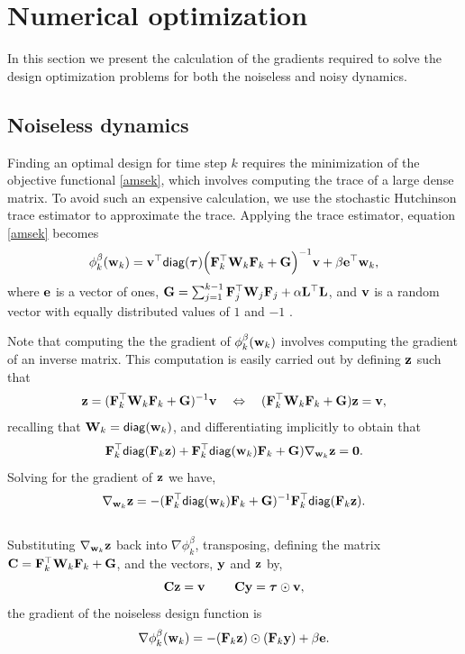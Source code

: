 \documentclass[leqno,onefignum,onetabnum]{siamltexmm}
\newcommand{\bfC}	{{\bf{C}}}
\newcommand{\bfF}	{{\bf{F}}}
\newcommand{\bfG}	{{\bf{G}}}
\newcommand{\bfL}	{{\bf{L}}}
\newcommand{\bfW}	{{\bf{W}}}
\newcommand{\bfe}	{{\bf{e}}}
\newcommand{\bfv}	{{\bf{v}}}
\newcommand{\bfw}	{{\bf{w}}}
\newcommand{\bfy}	{{\bf{y}}}
\newcommand{\bfz}	{{\bf{z}}}
\newcommand{\bftau}      {{\boldsymbol \tau}}
\newcommand {\zero}  {{\bf 0}}
\newcommand{\Grad}	{\ensuremath {{\bf{ \nabla}}}}
\newcommand{\LtL}       { \bfL^{\top}\bfL}
\begin{document}
\section{Numerical optimization}
\label{sec:Opt}
In this section we present the calculation of the gradients required to solve the design optimization problems for both the noiseless and noisy dynamics. 
\subsection{Noiseless dynamics}
Finding an optimal design for  time step $k$ requires the minimization of the objective functional \eqref{amsek}, which involves computing the trace of a large dense matrix. To avoid such an expensive calculation, we use the stochastic Hutchinson trace estimator to approximate the trace. Applying the trace estimator, equation \eqref{amsek} becomes
\begin{equation*}
\phi_k^{\beta}(\bfw_k) = \bfv^{\top}{\sf diag}(\bftau) \Big(\bfF_k^{\top}\bfW_k\bfF_k   + \bfG \Big)^{-1}\bfv + \beta\bfe^{\top}\bfw_k,
\end{equation*}
where $\bfe$ is a vector of ones, $\bfG = \sum_{j=1}^{k-1}\bfF_{j}^{\top}\bfW_{j}\bfF_{j}+ \alpha\LtL$, and $\bfv$ is a random vector with equally distributed values of $1$ and $-1$ \cite{Hutchinson1990,Haber2011}. 


Note that computing the the gradient of $\phi_k^{\beta}(\bfw_k)$ involves computing the gradient of an inverse matrix.
This computation is easily carried out by defining $\bfz$ such that
\begin{equation}
\label{eq:z}
\bfz = (\bfF_k^{\top}\bfW_k\bfF_k   + \bfG)^{-1}\bfv \quad \Leftrightarrow \quad
(\bfF_k^{\top}\bfW_k\bfF_k   + \bfG)\bfz = \bfv,
\end{equation}
  recalling that $\bfW_k = {\sf diag}(\bfw_k)$, and differentiating implicitly to obtain that
\begin{equation*}
\bfF_k^{\top}{\sf diag}(\bfF_k\bfz) + \bfF_k^{\top}{\sf diag}(\bfw_k)\bfF_k +\bfG)\Grad_{\bfw_k}\bfz =\zero.
\end{equation*}
Solving for the gradient of $\bfz$ we have,
\begin{equation*}
\nabla_{\bfw_k}\bfz = -(\bfF_k^{\top}{\sf diag}(\bfw_k)\bfF_k +\bfG)^{-1} \bfF_k^{\top}{\sf diag}(\bfF_k\bfz).
\end{equation*}
\\
Substituting $\nabla_{\bfw_k}\bfz$ back into $\nabla\phi_k^{\beta}$, transposing, defining the matrix $\bfC = \bfF_k^{\top}\bfW_k\bfF_k   + \bfG$, and the vectors, $\bfy$ and $\bfz$ by, 
$$\bfC\bfz = \bfv\ \quad \quad \bfC\bfy =\bftau\odot\bfv, $$ 
the gradient of the noiseless design function is
\begin{equation}
\nabla\phi_k^{\beta}(\bfw_k) =  -(\bfF_k\bfz)\odot(\bfF_k\bfy) + \beta\bfe.
\end{equation}
\end{document}
